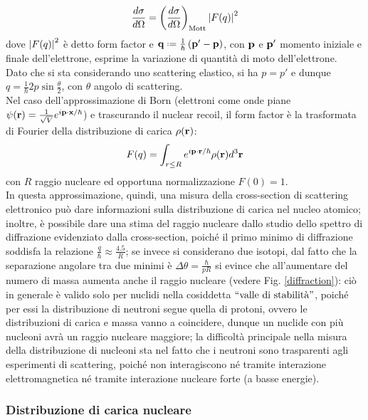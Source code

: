 \begin{equation}
	\frac{d\sigma}{d\Omega} = \left(\frac{d\sigma}{d\Omega}\right)_{\text{Mott}} \left\lvert F(q)\right\rvert^2
	\label{eq:12}
\end{equation}
dove $ \left\lvert F(q)\right\rvert^2 $ è detto form factor e $ \ve{q} \defeq \frac{1}{\hbar} \left( \ve{p}' - \ve{p} \right) $, con $ \mathbf{p} $ e $ \mathbf{p}' $ momento iniziale e finale dell'elettrone, esprime la variazione di quantità di moto dell'elettrone.\\
Dato che si sta considerando uno scattering elastico, si ha $ p = p' $ e dunque $ q = \frac{1}{\hbar} 2p \sin \frac{\theta}{2} $, con $ \theta $ angolo di scattering.\\
Nel caso dell'approssimazione di Born (elettroni come onde piane $ \psi(\mathbf{r}) = \frac{1}{\sqrt{V}} e^{i \mathbf{p}\cdot\mathbf{x} / \hbar} $) e trascurando il nuclear recoil, il form factor è la trasformata di Fourier della distribuzione di carica $ \rho(\mathbf{r}) $:
\begin{equation}
	F(q) = \int_{r \le R} e^{i \mathbf{p}\cdot\mathbf{r} / \hbar} \rho(\mathbf{r}) d^3\mathbf{r}
	\label{eq:13}
\end{equation}
con $ R $ raggio nucleare ed opportuna normalizzazione $ F(0) = 1 $.\\
In questa approssimazione, quindi, una misura della cross-section di scattering elettronico può dare informazioni sulla distribuzione di carica nel nucleo atomico; inoltre, è possibile dare una stima del raggio nucleare dallo studio dello spettro di diffrazione evidenziato dalla cross-section, poiché il primo minimo di diffrazione soddisfa la relazione $ \frac{q}{\hbar} \approx \frac{4.5}{R} $; se invece si considerano due isotopi, dal fatto che la separazione angolare tra due minimi è $ \Delta\theta = \frac{\hbar}{p R} $ si evince che all'aumentare del numero di massa aumenta anche il raggio nucleare (vedere Fig. \ref{diffraction}): ciò in generale è valido solo per nuclidi nella cosiddetta $ ``\text{valle di stabilità}" $, poiché per essi la distribuzione di neutroni segue quella di protoni, ovvero le distribuzioni di carica e massa vanno a coincidere, dunque un nuclide con più nucleoni avrà un raggio nucleare maggiore; la difficoltà principale nella misura della distribuzione di nucleoni sta nel fatto che i neutroni sono trasparenti agli esperimenti di scattering, poiché non interagiscono né tramite interazione elettromagnetica né tramite interazione nucleare forte (a basse energie).

\subsubsection{Distribuzione di carica nucleare}

